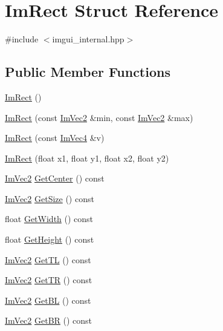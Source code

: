 \hypertarget{struct_im_rect}{}\section{Im\+Rect Struct Reference}
\label{struct_im_rect}


{\ttfamily \#include $<$imgui\+\_\+internal.\+hpp$>$}

\subsection*{Public Member Functions}
\begin{DoxyCompactItemize}
\item 
\hyperlink{struct_im_rect_a57399f36758ed3eb1eb762143401ff54}{Im\+Rect} ()
\item 
\hyperlink{struct_im_rect_a2f0ff273434bfd9d22bb699fd7a63a1f}{Im\+Rect} (const \hyperlink{struct_im_vec2}{Im\+Vec2} \&min, const \hyperlink{struct_im_vec2}{Im\+Vec2} \&max)
\item 
\hyperlink{struct_im_rect_adfe8d43381f9af8a3e3ea32a3821ab84}{Im\+Rect} (const \hyperlink{struct_im_vec4}{Im\+Vec4} \&v)
\item 
\hyperlink{struct_im_rect_a4cd168f1ae088e15db64b95b880f8933}{Im\+Rect} (float x1, float y1, float x2, float y2)
\item 
\hyperlink{struct_im_vec2}{Im\+Vec2} \hyperlink{struct_im_rect_aae13f8003184fd84f29d27c3c074cf43}{Get\+Center} () const
\item 
\hyperlink{struct_im_vec2}{Im\+Vec2} \hyperlink{struct_im_rect_ae459d9c50003058cfb34519a571aaf33}{Get\+Size} () const
\item 
float \hyperlink{struct_im_rect_afa75cb8491f20901c96166d17dcddac4}{Get\+Width} () const
\item 
float \hyperlink{struct_im_rect_a748d8ae9cb26508951ec6e2f2df0625b}{Get\+Height} () const
\item 
\hyperlink{struct_im_vec2}{Im\+Vec2} \hyperlink{struct_im_rect_a1d4d972329722b51dca4499cb5931b4b}{Get\+TL} () const
\item 
\hyperlink{struct_im_vec2}{Im\+Vec2} \hyperlink{struct_im_rect_acae90248a96be4acf1524071fca1c3f3}{Get\+TR} () const
\item 
\hyperlink{struct_im_vec2}{Im\+Vec2} \hyperlink{struct_im_rect_a59d9751bc7be6745dddf5b83b9155669}{Get\+BL} () const
\item 
\hyperlink{struct_im_vec2}{Im\+Vec2} \hyperlink{struct_im_rect_ad2f2687254beed5a9b19bde0d6fa14f5}{Get\+BR} () const
\item 

\end{DoxyCompactItemize}
